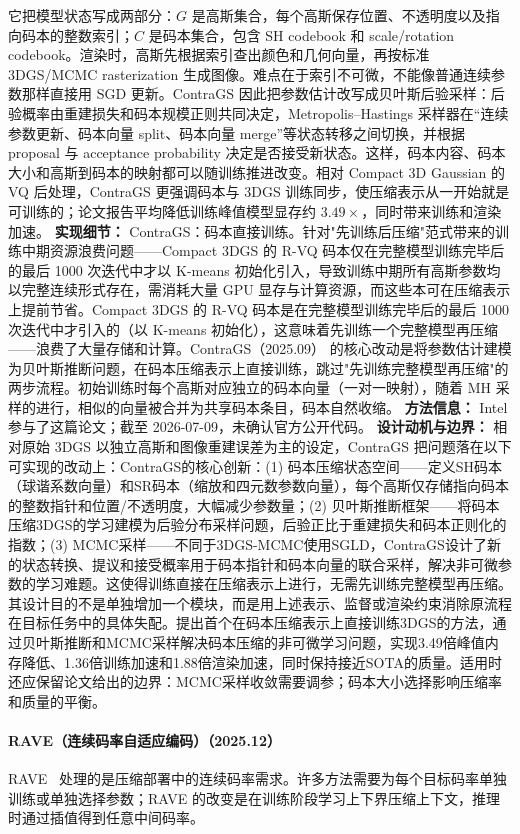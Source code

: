 它把模型状态写成两部分：$G$ 是高斯集合，每个高斯保存位置、不透明度以及指向码本的整数索引；$C$ 是码本集合，包含 SH codebook 和 scale/rotation codebook。渲染时，高斯先根据索引查出颜色和几何向量，再按标准 3DGS/MCMC rasterization 生成图像。难点在于索引不可微，不能像普通连续参数那样直接用 SGD 更新。ContraGS 因此把参数估计改写成贝叶斯后验采样：后验概率由重建损失和码本规模正则共同决定，Metropolis--Hastings 采样器在“连续参数更新、码本向量 split、码本向量 merge”等状态转移之间切换，并根据 proposal 与 acceptance probability 决定是否接受新状态。这样，码本内容、码本大小和高斯到码本的映射都可以随训练推进改变。相对 Compact 3D Gaussian 的 VQ 后处理，ContraGS 更强调码本与 3DGS 训练同步，使压缩表示从一开始就是可训练的；论文报告平均降低训练峰值模型显存约 $3.49\times$，同时带来训练和渲染加速。
\textbf{实现细节：} ContraGS：码本直接训练。针对"先训练后压缩"范式带来的训练中期资源浪费问题——Compact 3DGS 的 R-VQ 码本仅在完整模型训练完毕后的最后 1000 次迭代中才以 K-means 初始化引入，导致训练中期所有高斯参数均以完整连续形式存在，需消耗大量 GPU 显存与计算资源，而这些本可在压缩表示上提前节省。Compact 3DGS 的 R-VQ 码本是在完整模型训练完毕后的最后 1000 次迭代中才引入的（以 K-means 初始化），这意味着先训练一个完整模型再压缩——浪费了大量存储和计算。ContraGS（2025.09） 的核心改动是将参数估计建模为贝叶斯推断问题，在码本压缩表示上直接训练，跳过"先训练完整模型再压缩"的两步流程。初始训练时每个高斯对应独立的码本向量（一对一映射），随着 MH 采样的进行，相似的向量被合并为共享码本条目，码本自然收缩。
\textbf{方法信息：} Intel 参与了这篇论文；截至 2026-07-09，未确认官方公开代码。
\textbf{设计动机与边界：} 相对原始 3DGS 以独立高斯和图像重建误差为主的设定，ContraGS 把问题落在以下可实现的改动上：ContraGS的核心创新：(1) 码本压缩状态空间——定义SH码本（球谐系数向量）和SR码本（缩放和四元数参数向量），每个高斯仅存储指向码本的整数指针和位置/不透明度，大幅减少参数量；(2) 贝叶斯推断框架——将码本压缩3DGS的学习建模为后验分布采样问题，后验正比于重建损失和码本正则化的指数；(3) MCMC采样——不同于3DGS-MCMC使用SGLD，ContraGS设计了新的状态转换、提议和接受概率用于码本指针和码本向量的联合采样，解决非可微参数的学习难题。这使得训练直接在压缩表示上进行，无需先训练完整模型再压缩。其设计目的不是单独增加一个模块，而是用上述表示、监督或渲染约束消除原流程在目标任务中的具体失配。提出首个在码本压缩表示上直接训练3DGS的方法，通过贝叶斯推断和MCMC采样解决码本压缩的非可微学习问题，实现3.49倍峰值内存降低、1.36倍训练加速和1.88倍渲染加速，同时保持接近SOTA的质量。适用时还应保留论文给出的边界：MCMC采样收敛需要调参；码本大小选择影响压缩率和质量的平衡。
\paragraph{RAVE（连续码率自适应编码）（2025.12）}
RAVE~\cite{2512_07052} 处理的是压缩部署中的连续码率需求。许多方法需要为每个目标码率单独训练或单独选择参数；RAVE 的改变是在训练阶段学习上下界压缩上下文，推理时通过插值得到任意中间码率。

